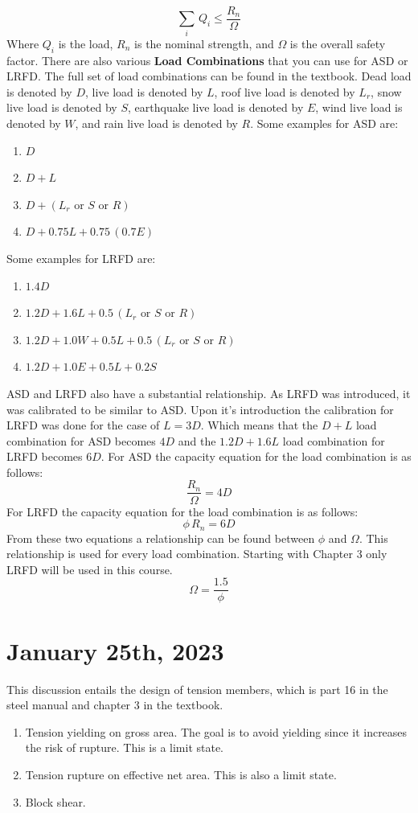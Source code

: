 \documentclass{article}
\begin{document}
\[\sum_i\, Q_i\leq\frac{R_n}{\Omega}\]
\noindent Where \(Q_i\) is the load, \(R_n\) is the nominal strength, and \(\Omega\) is the overall safety factor. 
\newpage
\noindent There are also various \textbf{Load Combinations} that you can use for ASD or LRFD. The full set of load combinations can be found in the textbook. Dead load is denoted by $D$, live load is denoted by $L$, roof live load is denoted by $L_r$, snow live load is denoted by $S$, earthquake live load is denoted by $E$, wind live load is denoted by $W$, and rain live load is denoted by $R$. Some examples for ASD are:
\begin{enumerate}
    \item $D$
    \item $D+L$
    \item $D+(L_r \text{ or } S \text{ or } R)$
    \item $D+0.75L+0.75\,(0.7E)$
\end{enumerate}
\noindent Some examples for LRFD are:
\begin{enumerate}
    \item $1.4D$ 
    \item $1.2D+1.6L+0.5\,(L_r \text{ or } S \text{ or } R)$
    \item $1.2D+1.0W+0.5L+0.5\,(L_r \text{ or } S \text{ or } R)$
    \item $1.2D+1.0E+0.5L+0.2S$
\end{enumerate}
\noindent ASD and LRFD also have a substantial relationship. As LRFD was introduced, it was calibrated to be similar to ASD. Upon it's introduction the calibration for LRFD was done for the case of $L=3D$. Which means that the $D+L$ load combination for ASD becomes $4D$ and the $1.2D+1.6L$ load combination for LRFD becomes $6D$. For ASD the capacity equation for the load combination is as follows:
\[\frac{R_n}{\Omega}=4D\] 
For LRFD the capacity equation for the load combination is as follows: 
\[\phi\, R_n=6D\]
From these two equations a relationship can be found between $\phi$ and $\Omega$. This relationship is used for every load combination. Starting with Chapter 3 only LRFD will be used in this course.
\[\Omega = \frac{1.5}{\phi}\]

\section*{January 25th, 2023}

This discussion entails the design of tension members, which is part 16 in the steel manual and chapter 3 in the textbook. 
\begin{enumerate} 
    \item Tension yielding on gross area. The goal is to avoid yielding since it increases the risk of rupture. This is a limit state.
    \item Tension rupture on effective net area. This is also a limit state.
    \item Block shear.
\end{enumerate} 
\end{document}
